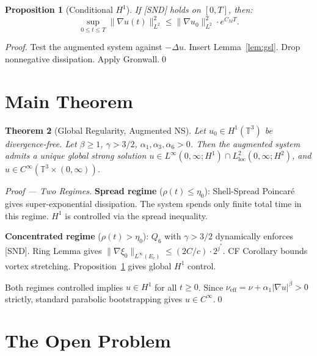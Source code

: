 \documentclass[11pt]{article}
\newtheorem{theorem}{Theorem}[section]
\newtheorem{proposition}[theorem]{Proposition}
\begin{document}
\begin{proposition}[Conditional $H^1$]\label{prop:H1}
If \emph{[SND]} holds on $[0,T]$, then:
\[
\sup_{0\leq t\leq T}\|\nabla u(t)\|^2_{L^2}
\leq \|\nabla u_0\|^2_{L^2}\cdot e^{C_M T}.
\]
\end{proposition}

\begin{proof}
Test the augmented system against $-\Delta u$.
Insert Lemma~\ref{lem:gsl}. Drop nonneg\-ative dissipation. Apply Gronwall.\qed
\end{proof}

\section{Main Theorem}

\begin{theorem}[Global Regularity, Augmented NS]\label{thm:main}
Let $u_0\in H^1(\mathbb{T}^3)$ be divergence-free. Let $\beta\geq 1$, $\gamma>3/2$,
$\alpha_1,\alpha_3,\alpha_6>0$. Then the augmented system admits a unique global strong
solution $u\in L^\infty(0,\infty;H^1)\cap L^2_{\mathrm{loc}}(0,\infty;H^2)$,
and $u\in C^\infty(\mathbb{T}^3\times(0,\infty))$.
\end{theorem}

\begin{proof}[Proof --- Two Regimes]
\textbf{Spread regime} ($\rho(t)\leq\eta_0$):
Shell-Spread Poincar\'e gives super-exponential dissipation. The system spends only finite
total time in this regime. $H^1$ is controlled via the spread inequality.

\textbf{Concentrated regime} ($\rho(t)>\eta_0$):
$Q_6$ with $\gamma>3/2$ dynamically enforces [SND]. Ring Lemma gives
$\|\nabla\xi_0\|_{L^\infty(E_c)}\leq(2C/c)\cdot 2^{j^*}$.
CF Corollary bounds vortex stretching. Proposition~\ref{prop:H1} gives global $H^1$ control.

Both regimes controlled implies $u\in H^1$ for all $t\geq 0$. Since
$\nu_{\mathrm{eff}} = \nu + \alpha_1|\nabla u|^\beta > 0$ strictly, standard parabolic
bootstrapping gives $u\in C^\infty$.\qed
\end{proof}

\section{The Open Problem}\label{sec:open}
\end{document}

